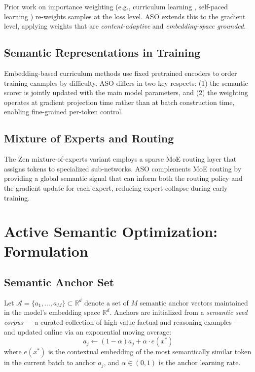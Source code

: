 \documentclass[11pt,a4paper]{article}
\begin{document}
Prior work on importance weighting (e.g., curriculum learning \cite{bengio2009curriculum},
self-paced learning \cite{kumar2010selfpaced}) re-weights samples at the loss level.
ASO extends this to the gradient level, applying weights that are \emph{content-adaptive}
and \emph{embedding-space grounded}.

\subsection{Semantic Representations in Training}

Embedding-based curriculum methods \cite{hacohen2019power} use fixed pretrained encoders
to order training examples by difficulty. ASO differs in two key respects: (1) the
semantic scorer is jointly updated with the main model parameters, and (2) the weighting
operates at gradient projection time rather than at batch construction time, enabling
fine-grained per-token control.

\subsection{Mixture of Experts and Routing}

The Zen mixture-of-experts variant employs a sparse MoE routing layer that
assigns tokens to specialized sub-networks. ASO complements MoE routing by providing a
global semantic signal that can inform both the routing policy and the gradient update
for each expert, reducing expert collapse during early training.

\section{Active Semantic Optimization: Formulation}
\label{sec:formulation}

\subsection{Semantic Anchor Set}

Let $\mathcal{A} = \{a_1, \ldots, a_M\} \subset \mathbb{R}^d$ denote a set of $M$
semantic anchor vectors maintained in the model's embedding space $\mathbb{R}^d$.
Anchors are initialized from a \emph{semantic seed corpus} — a curated collection of
high-value factual and reasoning examples — and updated online via an exponential moving
average:
\begin{equation}
    a_j \leftarrow (1-\alpha) a_j + \alpha \cdot e(x^*)
    \label{eq:anchor_update}
\end{equation}
where $e(x^*)$ is the contextual embedding of the most semantically similar token in
the current batch to anchor $a_j$, and $\alpha \in (0,1)$ is the anchor learning rate.
\end{document}
